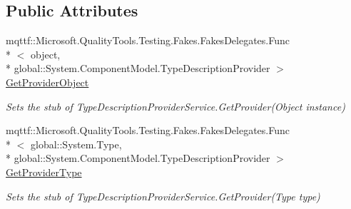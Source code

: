 \subsection*{Public Attributes}
\begin{DoxyCompactItemize}
\item 
mqttf\-::\-Microsoft.\-Quality\-Tools.\-Testing.\-Fakes.\-Fakes\-Delegates.\-Func\\*
$<$ object, \\*
global\-::\-System.\-Component\-Model.\-Type\-Description\-Provider $>$ \hyperlink{class_system_1_1_component_model_1_1_design_1_1_fakes_1_1_stub_type_description_provider_service_aebd7cd3a3c70119231320ec3e23ee779}{Get\-Provider\-Object}
\begin{DoxyCompactList}\small\item\em Sets the stub of Type\-Description\-Provider\-Service.\-Get\-Provider(\-Object instance)\end{DoxyCompactList}\item 
mqttf\-::\-Microsoft.\-Quality\-Tools.\-Testing.\-Fakes.\-Fakes\-Delegates.\-Func\\*
$<$ global\-::\-System.\-Type, \\*
global\-::\-System.\-Component\-Model.\-Type\-Description\-Provider $>$ \hyperlink{class_system_1_1_component_model_1_1_design_1_1_fakes_1_1_stub_type_description_provider_service_a789f1bd753e85e7d0eee85a167720cae}{Get\-Provider\-Type}
\begin{DoxyCompactList}\small\item\em Sets the stub of Type\-Description\-Provider\-Service.\-Get\-Provider(\-Type type)\end{DoxyCompactList}\end{DoxyCompactItemize}
